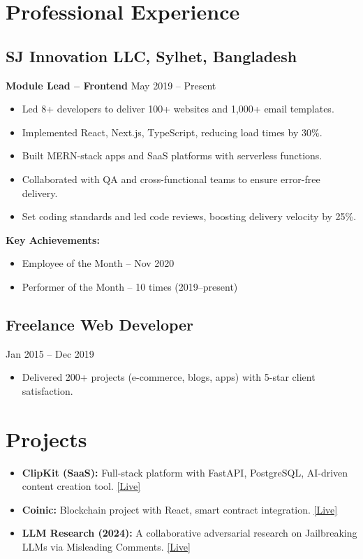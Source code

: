 \documentclass[a4paper,9pt]{article}
\begin{document}
\section*{Professional Experience}
\subsection*{SJ Innovation LLC, Sylhet, Bangladesh}
\textbf{Module Lead – Frontend} \hfill May 2019 – Present
\begin{itemize}[leftmargin=*,itemsep=0.3pt]
    \item Led 8+ developers to deliver 100+ websites and 1,000+ email templates.
    \item Implemented React, Next.js, TypeScript, reducing load times by 30\%.
    \item Built MERN-stack apps and SaaS platforms with serverless functions.
    \item Collaborated with QA and cross-functional teams to ensure error-free delivery.
    \item Set coding standards and led code reviews, boosting delivery velocity by 25\%.
\end{itemize}
\textbf{Key Achievements:}
\begin{itemize}[leftmargin=*,itemsep=0.3pt]
    \item Employee of the Month – Nov 2020
    \item Performer of the Month – 10 times (2019–present)
\end{itemize}

\subsection*{Freelance Web Developer}
\textbf{} \hfill Jan 2015 – Dec 2019
\begin{itemize}[leftmargin=*,itemsep=0.3pt]
    \item Delivered 200+ projects (e-commerce, blogs, apps) with 5-star client satisfaction.
\end{itemize}

\section*{Projects}
\begin{itemize}[leftmargin=*,itemsep=0.3pt]
    \item \textbf{ClipKit (SaaS):} Full-stack platform with FastAPI, PostgreSQL, AI-driven content creation tool. \href{https://github.com/RajonDey/clipkit-app/}{[Live]}
    \item \textbf{Coinic:} Blockchain project with React, smart contract integration. \href{https://rdc-coinic.netlify.app/}{[Live]}
    \item \textbf{LLM Research (2024):} A collaborative adversarial research on Jailbreaking LLMs via Misleading Comments. \href{https://llm-vulnerability-site.vercel.app/}{[Live]}
\end{itemize}
\end{document}
